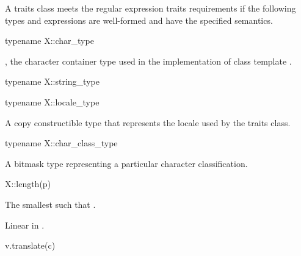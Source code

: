 \pnum
A traits class  meets the regular expression traits requirements
if the following types and expressions are well-formed and have the specified
semantics.

\begin{itemdecl}
typename X::char_type
\end{itemdecl}

\begin{itemdescr}
\pnum
\result
{},
the character container type used in the implementation of class
template .
\end{itemdescr}

\begin{itemdecl}
typename X::string_type
\end{itemdecl}

\begin{itemdescr}
\pnum
\result
{}
\end{itemdescr}

\begin{itemdecl}
typename X::locale_type
\end{itemdecl}

\begin{itemdescr}
\pnum
\result
A copy constructible type
that represents the locale used by the traits class.
\end{itemdescr}

\begin{itemdecl}
typename X::char_class_type
\end{itemdecl}

\begin{itemdescr}
\pnum
\result
A bitmask type
representing a particular character classification.
\end{itemdescr}

\begin{itemdecl}
X::length(p)
\end{itemdecl}

\begin{itemdescr}
\pnum
\result
{}

\pnum
\returns
The smallest  such that .

\pnum
\complexity
Linear in .
\end{itemdescr}

\begin{itemdecl}
v.translate(c)
\end{itemdecl}

